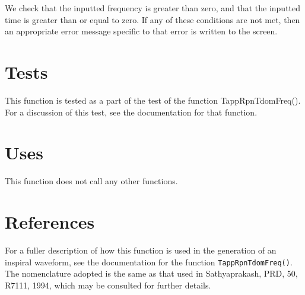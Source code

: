 \documentclass[12pt]{article}
\begin{document}
We check that the inputted frequency is greater than zero, and that the inputted time is greater than or equal to zero. If any of these conditions are not met, then an appropriate error message specific to that error is written to the screen. 


\section{Tests}

This function is tested as a part of the test of the function TappRpnTdomFreq(). For a discussion of this test, see the documentation for that function.

\section{Uses}

This function does not call any other functions.


\section{References}
For a fuller description of how this function is used in the generation of an inspiral waveform, see the documentation for the function \texttt{TappRpnTdomFreq()}.
The nomenclature adopted is the same as that used in Sathyaprakash, PRD, 50, R7111, 1994, which may be consulted for further details.
 
\end{document}

